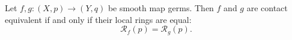 Let $f, g: (X, p) \to (Y, q)$ be smooth map germs. Then $f$ and $g$ are contact equivalent if and only if their local rings are equal:
$$
\mathcal{R}_f(p) = \mathcal{R}_g(p).
$$
